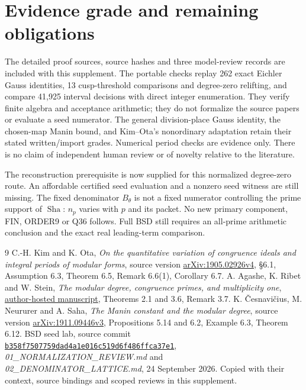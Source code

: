 \documentclass[11pt]{article}
\newcommand{\Sha}{\operatorname{Sha}}
\begin{document}
\section{Evidence grade and remaining obligations}
The detailed proof sources, source hashes and three model-review records
are included with this supplement. The portable checks replay 262 exact
Eichler Gauss identities, 13 cusp-threshold comparisons and degree-zero
relifting, and compare 41,925 interval decisions with direct integer
enumeration. They verify finite algebra and acceptance arithmetic; they
do not formalize the source papers or evaluate a seed numerator.
The general division-place Gauss identity, the chosen-map Manin bound,
and Kim--Ota's nonordinary adaptation retain their stated written/import
grades. Numerical period checks are evidence only. There is no claim of
independent human review or of novelty relative to the literature.

The reconstruction prerequisite is now supplied for this normalized
degree-zero route. An affordable certified seed evaluation and a nonzero
seed witness are still missing. The fixed denominator $B_\theta$ is not
a fixed numerator controlling the prime support of $\Sha$: $n_p$ varies
with $p$ and its packet. No new primary component, FIN, ORDER9 or Q36
follows. Full BSD still requires an all-prime arithmetic conclusion and
the exact real leading-term comparison.

\begin{thebibliography}{9}
 C.-H. Kim and K. Ota,
\emph{On the quantitative variation of congruence ideals and integral
periods of modular forms}, source version
\href{https://arxiv.org/pdf/1905.02926v4}{arXiv:1905.02926v4},
\S6.1, Assumption 6.3, Theorem 6.5, Remark 6.6(1), Corollary 6.7.
 A. Agashe, K. Ribet and W. Stein,
\emph{The modular degree, congruence primes, and multiplicity one},
\href{https://www.math.fsu.edu/~agashe/math/moddeg3.pdf}{author-hosted manuscript},
Theorems 2.1 and 3.6, Remark 3.7.
 K. \v{C}esnavi\v{c}ius, M. Neururer and A. Saha,
\emph{The Manin constant and the modular degree}, source version
\href{https://arxiv.org/pdf/1911.09446v3}{arXiv:1911.09446v3},
Propositions 5.14 and 6.2, Example 6.3, Theorem 6.12.
 BSD seed lab, source commit
\href{https://github.com/Bome2017/bsd-seed-lab/commit/b358f7507759dad4a1e016c519d6f486ffca37e1}{\texttt{b358f7507759dad4a1e016c519d6f486ffca37e1}},
\emph{01\_NORMALIZATION\_REVIEW.md} and
\emph{02\_DENOMINATOR\_LATTICE.md}, 24 September 2026.
Copied with their context, source bindings and scoped reviews in this supplement.
\end{thebibliography}
\end{document}
